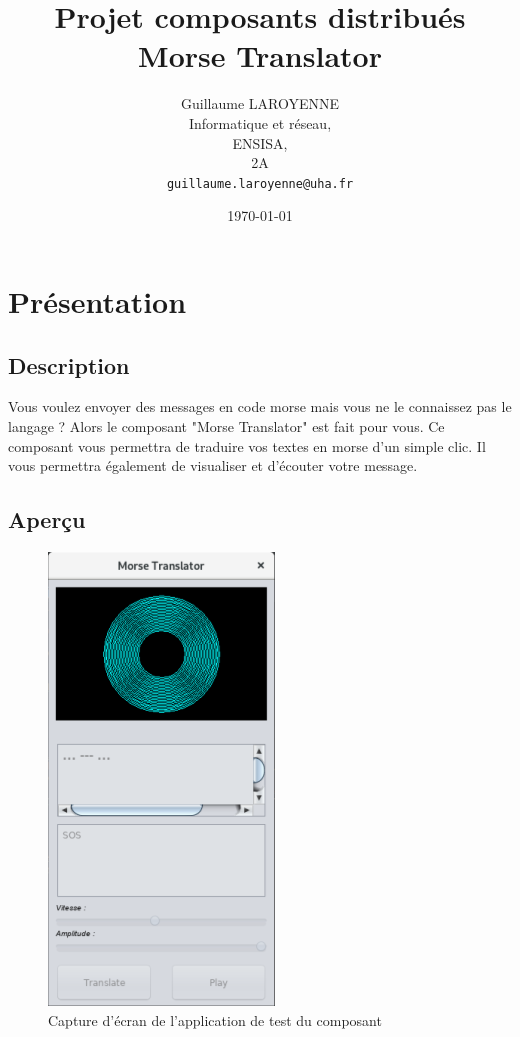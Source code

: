 \documentclass[a4paper,11pt]{article}
\title{\LARGE{Projet composants distribués}\\\bigskip \textbf{Morse Translator}}
\author{Guillaume LAROYENNE\\
   Informatique et réseau,\\
   ENSISA,\\
   2A\\
   \bigskip
   \texttt{guillaume.laroyenne@uha.fr}
   }
\date{\today}
\begin{document}
  \maketitle
      
  \newpage

	\section{Présentation}
	\subsection{Description}
	Vous voulez envoyer des messages en code morse mais vous ne le connaissez pas le langage ? Alors le composant "Morse Translator" est fait pour vous. Ce composant vous permettra de traduire vos textes en morse d'un simple clic. Il vous permettra également de visualiser et d'écouter votre message.
	
    \subsection{Aperçu}
    \begin{figure}[H]
    	\begin{center}
    		\includegraphics[scale=0.8]{descpicture.png}
    		\caption{Capture d'écran de l'application de test du composant}
    		\label{Capture d'écran de l'application de test du composant}
    	\end{center}
    \end{figure}
    
\end{document}
